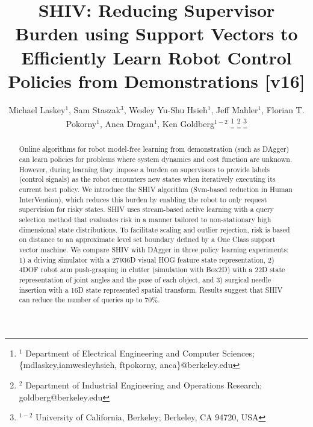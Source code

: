 \documentclass[10pt, conference]{ieeeconf}      %
\title{SHIV: Reducing Supervisor Burden using Support Vectors to Efficiently Learn Robot Control Policies from Demonstrations [v16]}
\author{Michael Laskey$^1$, Sam Staszak$^3$, Wesley Yu-Shu Hsieh$^1$, Jeff Mahler$^1$, Florian T. Pokorny$^1$, Anca Dragan$^1$, Ken Goldberg$^{1-2}$%
\thanks{$^1$ Department of Electrical Engineering and Computer Sciences; {\small \{mdlaskey,iamwesleyhsieh, ftpokorny, anca\}@berkeley.edu}}%
\thanks{$^2$ Department of Industrial Engineering and Operations Research; {\small goldberg@berkeley.edu}}%
\thanks{$^{1-2}$ University of California, Berkeley;  Berkeley, CA 94720, USA}%
}
\begin{document}
\maketitle
\thispagestyle{empty}
\pagestyle{empty}



\begin{abstract}
Online algorithms for robot model-free learning from demonstration (such as DAgger) can learn policies for problems where system
dynamics and cost function are unknown. However, during learning they impose a burden on supervisors to provide labels (control
signals) as the robot encounters new states when iteratively executing its current best policy. We introduce the SHIV
algorithm (Svm-based reduction in Human InterVention), which reduces this burden by enabling the robot to only request supervision for risky states. SHIV uses stream-based active learning with a query selection method that evaluates risk in a manner tailored to non-stationary high dimensional state distributions.  To facilitate scaling and outlier rejection, risk is based on distance to an approximate level set boundary defined by a One Class support vector machine.  We compare SHIV with DAgger in three policy learning experiments: 1) a driving simulator with a 27936D visual HOG feature state representation, 2) 4DOF robot arm push-grasping in clutter (simulation with Box2D) with a 22D state representation  of joint angles and the pose of each object, and 3) surgical needle insertion with a 16D state represented spatial transform.  Results suggest that SHIV can reduce the number of queries up to 70$\%$.





\end{abstract}
\end{document}
